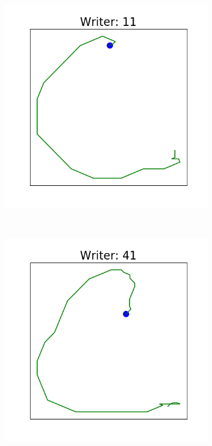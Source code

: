 \begin{figure}[!htbp]
\begin{subfigure}{0.45\textwidth}
      \end{subfigure}
      ~
      \begin{subfigure}{0.45\textwidth}
          \includegraphics[scale=0.50]{images/framework/C_11.png}
      \end{subfigure}
      ~
      \begin{subfigure}{0.45\textwidth}
          \includegraphics[scale=0.50]{images/framework/C_41.png}
      \end{subfigure}


\end{figure}
